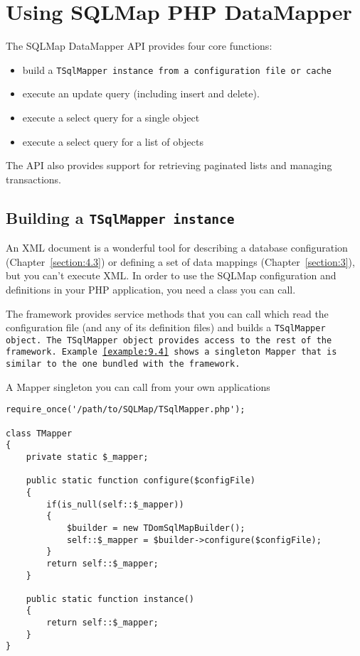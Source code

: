 \chapter{Using SQLMap PHP DataMapper}
The SQLMap DataMapper API provides four core functions:

\begin{itemize}
  \item build a \tt{TSqlMapper} instance from a configuration file or cache
  \item execute an update query (including insert and delete).
  \item execute a select query for a single object
  \item execute a select query for a list of objects
\end{itemize}

The API also provides support for retrieving paginated lists and managing
transactions.

\section{Building a \tt{TSqlMapper} instance}
An XML document is a wonderful tool for describing a database configuration
(Chapter~\ref{section:4.3}) or defining a set of data mappings
(Chapter~\ref{section:3}), but you can't execute XML. In order to use the
SQLMap configuration and definitions in your PHP application, you need a class
you can call.

The framework provides service methods that you can call which read the
configuration file (and any of its definition files) and builds a
\tt{TSqlMapper} object. The \tt{TSqlMapper} object provides access to the rest
of the framework. Example~\ref{example:9.4} shows a singleton Mapper that is
similar to the one bundled with the framework.

\begin{example}\label{example:9.4}
A Mapper singleton you can call from your own applications
\begin{verbatim}
require_once('/path/to/SQLMap/TSqlMapper.php');

class TMapper
{
    private static $_mapper;

    public static function configure($configFile)
    {
        if(is_null(self::$_mapper))
        {
            $builder = new TDomSqlMapBuilder();
            self::$_mapper = $builder->configure($configFile);
        }
        return self::$_mapper;
    }

    public static function instance()
    {
        return self::$_mapper;
    }
}
\end{verbatim}
\end{example}

